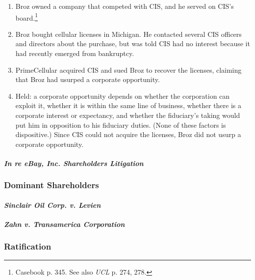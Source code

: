 \begin{enumerate}
    \item Broz owned a company that competed with CIS, and he served on CIS's 
    board.\footnote{Casebook p. 345. See also \emph{UCL} p. 274, 278.}
    \item Broz bought cellular licenses in Michigan. He contacted several CIS 
    officers and directors about the purchase, but was told CIS had no interest 
    because it had recently emerged from bankruptcy.
    \item PrimeCellular acquired CIS and sued Broz to recover the licenses, 
    claiming that Broz had usurped a corporate opportunity.
    \item Held: a corporate opportunity depends on whether the corporation can 
    exploit it, whether it is within the same line of business, whether there is 
    a corporate interest or expectancy, and whether the fiduciary's taking would 
    put him in opposition to his fiduciary duties. (None of these factors is 
    dispositive.) Since CIS could not acquire the licenses, Broz did not usurp a 
    corporate opportunity.
\end{enumerate}

\paragraph{\emph{In re eBay, Inc. Shareholders Litigation}}


\subsubsection{Dominant Shareholders}

\paragraph{\emph{Sinclair Oil Corp. v. Levien}}


\paragraph{\emph{Zahn v. Transamerica Corporation}}


\subsubsection{Ratification}

